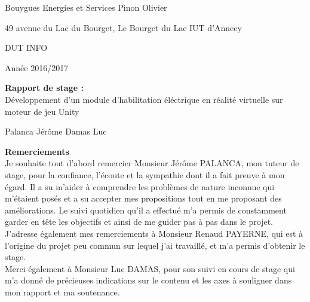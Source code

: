 \documentclass[a4paper]{article}
\begin{document}
    Bouygues Energies et Services
    \hfill
    Pinon Olivier

    49 avenue du Lac du Bourget, Le Bourget du Lac
    \hfill
    IUT d'Annecy \newline 
    
    \begin{flushright}
        DUT INFO
    \end{flushright}
    
     \begin{flushright}
        Année 2016/2017
    \end{flushright}
    
    \vfill 
    \begin{center}
		\huge{\textbf{Rapport de stage : }} \\
        \vspace{20pt}
        \large{Développement d'un module d'habilitation éléctrique en réalité virtuelle sur moteur de jeu Unity}
        
	\end{center}
    \vfill 
    
    Palanca Jérôme  \hfill Damas Luc
 
 	\newpage 
    
    \huge \textbf{Remerciements} \vspace{5pt} \\
   
    \normalsize
    Je souhaite tout d'abord remercier Monsieur Jérôme PALANCA, mon tuteur de stage, pour la confiance, l'écoute et la sympathie dont il a fait preuve à mon égard. Il a su m'aider à comprendre les problèmes de nature inconnue qui m'étaient posés et a su accepter mes propositions tout en me proposant des améliorations. Le suivi quotidien qu'il a effectué m'a permis de constamment garder en tête les objectifs et ainsi de me guider pas à pas dans le projet. \vspace{10pt} \\

    J'adresse également mes remerciements à Monsieur Renaud PAYERNE, qui est à l'origine du projet peu commun sur lequel j'ai travaillé, et m'a permis d'obtenir le stage. \vspace{10pt} \\

	Merci également à Monsieur Luc DAMAS, pour son suivi en cours de stage qui m'a donné de précieuses indications sur le contenu et les axes à souligner dans mon rapport et ma soutenance. \vspace{10pt} \\
\end{document}
